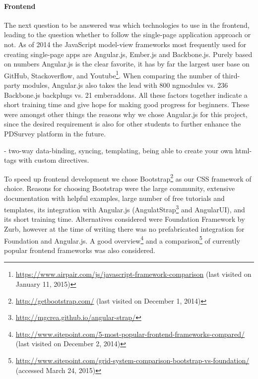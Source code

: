 	\paragraph{Frontend}

		The next question to be answered was which technologies to use in the frontend, leading to the question whether to follow the single-page application approach or not. As of 2014 the JavaScript model-view frameworks most frequently used for creating single-page apps are Angular.js, Ember.js and Backbone.js. Purely based on numbers Angular.js is the clear favorite, it has by far the largest user base on GitHub, Stackoverflow, and Youtube\footnote{\url{https://www.airpair.com/js/javascript-framework-comparison} (last visited on January 11, 2015)}. When comparing the number of third-party modules, Angular.js also takes the lead with 800 ngmodules vs. 236 Backbone.js backplugs vs. 21 emberaddons. All these factors together indicate a short training time and give hope for making good progress for beginners. These were amongst other things the reasons why we chose Angular.js for this project, since the desired requirement is also for other students to further enhance the PDSurvey platform in the future.

			- two-way data-binding, syncing, templating, being able to create your own html-tags with custom directives.

		To speed up frontend development we chose Bootstrap\footnote{\url{http://getbootstrap.com/} (last visited on December 1, 2014)} as our CSS framework of choice. Reasons for choosing Bootstrap were the large community, extensive documentation with helpful examples, large number of free tutorials and templates, its integration with Angular.js (AngulatStrap\footnote{\url{http://mgcrea.github.io/angular-strap/}} and AngularUI), and its short training time.
		Alternatives considered were Foundation Framework by Zurb, however at the time of writing there was no prefabricated integration for Foundation and Angular.js.
		A good overview\footnote{\url{http://www.sitepoint.com/5-most-popular-frontend-frameworks-compared/} (last visited on December 2, 2014)} and a comparison\footnote{\url{http://www.sitepoint.com/grid-system-comparison-bootstrap-vs-foundation/} (accessed March 24, 2015)} of currently popular frontend frameworks was also considered.

	

